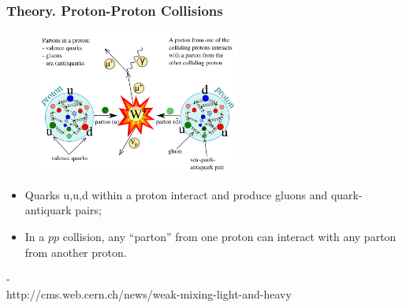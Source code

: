 \begin{frame}\frametitle{Theory. Proton-Proton Collisions}
\begin{figure}[htb]
  \begin{center}
    \includegraphics[width=0.60\textwidth]{../figs/ForPresentation/Theory_ppCollision.png}
  \end{center}
\end{figure}
\scriptsize
\begin{itemize}
  \item Quarks u,u,d within a proton interact and produce gluons and quark-antiquark pairs;
  \item In a $pp$ collision, any ``parton'' from one proton can interact with any parton from another proton.
\end{itemize}
\tiny
- \\
http://cms.web.cern.ch/news/weak-mixing-light-and-heavy
\end{frame}%

